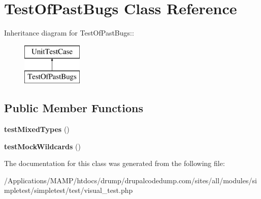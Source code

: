 \hypertarget{class_test_of_past_bugs}{
\section{TestOfPastBugs Class Reference}
\label{class_test_of_past_bugs}
}
Inheritance diagram for TestOfPastBugs::\begin{figure}[H]
\begin{center}
\leavevmode
\includegraphics[height=2cm]{class_test_of_past_bugs}
\end{center}
\end{figure}
\subsection*{Public Member Functions}
\begin{DoxyCompactItemize}
\item 
\hypertarget{class_test_of_past_bugs_ac13ca5b939b41ca3493dcd604f18ff78}{
{\bfseries testMixedTypes} ()}
\label{class_test_of_past_bugs_ac13ca5b939b41ca3493dcd604f18ff78}

\item 
\hypertarget{class_test_of_past_bugs_a8c8b0b3ab7abc0d97f5494b9ff00100f}{
{\bfseries testMockWildcards} ()}
\label{class_test_of_past_bugs_a8c8b0b3ab7abc0d97f5494b9ff00100f}

\end{DoxyCompactItemize}


The documentation for this class was generated from the following file:\begin{DoxyCompactItemize}
\item 
/Applications/MAMP/htdocs/drump/drupalcodedump.com/sites/all/modules/simpletest/simpletest/test/visual\_\-test.php\end{DoxyCompactItemize}
